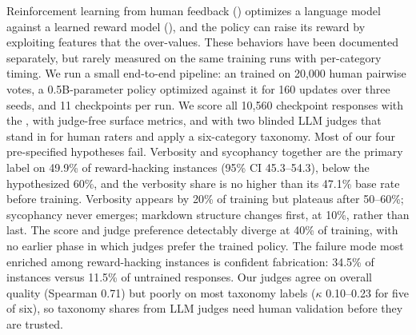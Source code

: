Reinforcement learning from human feedback (\rlhf) optimizes a language model against a learned reward model (\rmodel), and the policy can raise its reward by exploiting features that the \rmodel over-values.
These behaviors have been documented separately, but rarely measured on the same training runs with per-category timing.
We run a small end-to-end \rlhf pipeline: an \rmodel trained on 20,000 human pairwise votes, a 0.5B-parameter policy optimized against it for 160 updates over three seeds, and 11 checkpoints per run.
We score all 10,560 checkpoint responses with the \rmodel, with judge-free surface metrics, and with two blinded LLM judges that stand in for human raters and apply a six-category taxonomy.
Most of our four pre-specified hypotheses fail.
Verbosity and sycophancy together are the primary label on 49.9\% of reward-hacking instances (95\% CI 45.3--54.3), below the hypothesized 60\%, and the verbosity share is no higher than its 47.1\% base rate before training.
Verbosity appears by 20\% of training but plateaus after 50--60\%; sycophancy never emerges; markdown structure changes first, at 10\%, rather than last.
The \rmodel score and judge preference detectably diverge at 40\% of training, with no earlier phase in which judges prefer the trained policy.
The failure mode most enriched among reward-hacking instances is confident fabrication: 34.5\% of instances versus 11.5\% of untrained responses.
Our judges agree on overall quality (Spearman 0.71) but poorly on most taxonomy labels ($\kappa$ 0.10--0.23 for five of six), so taxonomy shares from LLM judges need human validation before they are trusted.
